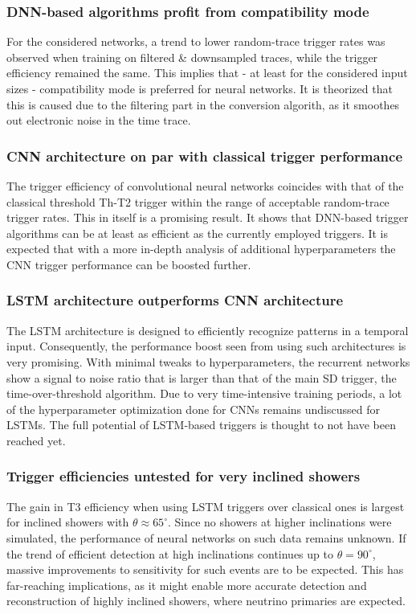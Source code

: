 \subsubsection{DNN-based algorithms profit from compatibility mode}

For the considered networks, a trend to lower random-trace trigger rates was observed when training on filtered \& downsampled traces, while the trigger efficiency
remained the same. This implies that - at least for the considered input sizes - compatibility mode is preferred for neural networks. It is theorized that this is
caused due to the filtering part in the conversion algorith, as it smoothes out electronic noise in the time trace. 

\subsubsection{CNN architecture on par with classical trigger performance}

The trigger efficiency of convolutional neural networks coincides with that of the classical threshold Th-T2 trigger within the range of acceptable random-trace 
trigger rates. This in itself is a promising result. It shows that DNN-based trigger algorithms can be at least as efficient as the currently employed triggers.
It is expected that with a more in-depth analysis of additional hyperparameters the CNN trigger performance can be boosted further.

\subsubsection{LSTM architecture outperforms CNN architecture}

The LSTM architecture is designed to efficiently recognize patterns in a temporal input. Consequently, the performance boost seen from using such architectures is
very promising. With minimal tweaks to hyperparameters, the recurrent networks show a signal to noise ratio that is larger than that of the main SD trigger, the 
time-over-threshold algorithm. Due to very time-intensive training periods, a lot of the hyperparameter optimization done for CNNs remains undiscussed for LSTMs.
The full potential of LSTM-based triggers is thought to not have been reached yet.

\subsubsection{Trigger efficiencies untested for very inclined showers}

The gain in T3 efficiency when using LSTM triggers over classical ones is largest for inclined showers with $\theta\approx65^\circ$. Since no showers at higher 
inclinations were simulated, the performance of neural networks on such data remains unknown. If the trend of efficient detection at high inclinations continues up
to $\theta = 90^\circ$, massive improvements to sensitivity for such events are to be expected. This has far-reaching implications, as it might enable more accurate
detection and reconstruction of highly inclined showers, where neutrino primaries are expected.